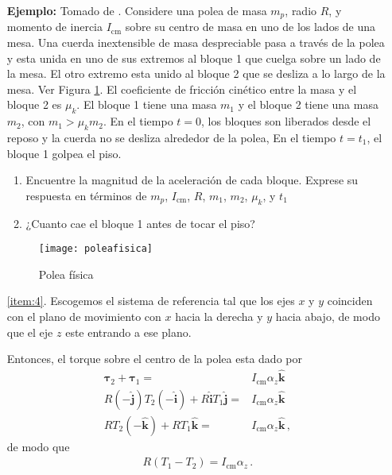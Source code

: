 \begin{itemize}
\item[\textbf{Ejemplo:}] Tomado de \cite{mit2009}. Considere una polea de masa $m_p$, radio $R$, y momento de inercia $I_{\text{cm}}$ sobre su centro de masa en uno de los lados de una mesa. Una cuerda inextensible de masa despreciable pasa a través de la polea y esta unida en uno de sus extremos al bloque 1 que cuelga sobre un lado de la mesa. El otro extremo esta unido al bloque 2 que se desliza a lo largo de la mesa. Ver Figura \ref{fig:poleafisica}. El coeficiente de fricción cinético entre la masa y el bloque 2 es $\mu_k$. El bloque 1 tiene una masa $m_1$ y el bloque 2 tiene una masa $m_2$, con $m_1>\mu_k m_2$. En el tiempo $t=0$, los bloques son liberados desde el reposo y la cuerda no se desliza alrededor de la polea,  En el tiempo $t=t_1$, el bloque 1 golpea el piso.
  \begin{enumerate}
  \item Encuentre la magnitud de la aceleración de cada bloque. Exprese su respuesta en términos de $m_p$, $I_{\text{cm}}$, $R$, $m_1$, $m_2$, $\mu_k$, y $t_1$
    \label{item:4}
  \item ¿Cuanto cae el bloque 1 antes de tocar el piso?
    \label{item:5}
  \end{enumerate}

  \begin{figure}
    \centering
    \texttt{[image: poleafisica]}
    \caption{Polea física}
    \label{fig:poleafisica}
  \end{figure}

\ref{item:4}. Escogemos el sistema de referencia tal que los ejes $x$ y $y$ coinciden con el plano de movimiento con $x$ hacia la derecha y $y$ hacia abajo, de modo que  el eje $z$ este entrando a ese plano. 

Entonces, el torque sobre el centro de la polea esta dado por
\begin{align}
  \boldsymbol{\tau}_2+\boldsymbol{\tau}_1=&I_{\text{cm}}\alpha_z\hat{\mathbf{k}}\nonumber\\
  R(-\hat{\mathbf{j}})T_2(-\hat{\mathbf{i}})+R\hat{\mathbf{i}}T_1\hat{\mathbf{j}}=&I_{\text{cm}}\alpha_z\hat{\mathbf{k}}\nonumber\\
  RT_2(-\hat{\mathbf{k}})+RT_1\hat{\mathbf{k}}=&I_{\text{cm}}\alpha_z\hat{\mathbf{k}}\,,
\end{align}
de modo que
\begin{align}
  \label{eq:1}
  R(T_1-T_2)=I_{\text{cm}}\alpha_z\,.
\end{align}


\end{itemize}
